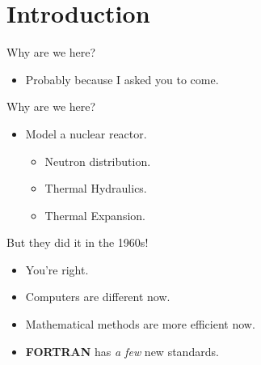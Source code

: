 \section{Introduction}
\label{sec:introduction}

\begin{frame}{Why are we here?}
  \pause
  \begin{itemize}
    \item Probably because I asked you to come.
  \end{itemize}
\end{frame}

\begin{frame}{Why are we here?}
  \begin{itemize}
    \item Model a nuclear reactor.
      \pause
      \begin{itemize}
        \item Neutron distribution.
        \item Thermal Hydraulics.
        \item Thermal Expansion.
      \end{itemize}
  \end{itemize}
\end{frame}

\begin{frame}{But they did it in the 1960s!}
  \begin{itemize}
    \item You're right.
    \item Computers are different now.
    \item Mathematical methods are more efficient now.
    \item \textbf{FORTRAN} has \textit{a few} new standards.
  \end{itemize}
\end{frame}

